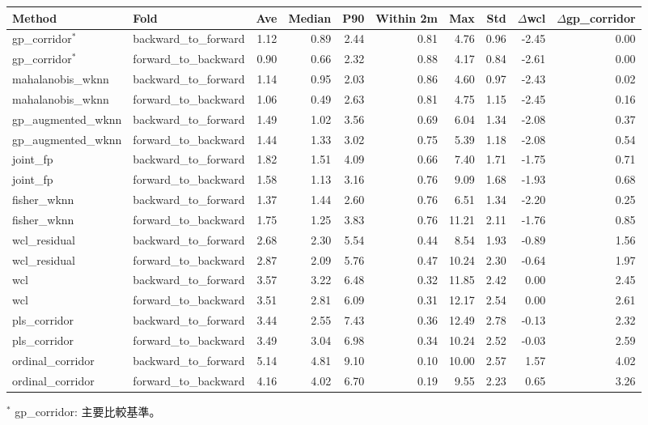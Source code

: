 \begin{tabular}{llrrrrrrrr}
\toprule
Method & Fold & Ave & Median & P90 & Within 2m & Max & Std & $\Delta$wcl & $\Delta$gp\_corridor \\
\midrule
gp\_corridor$^{\ast}$ & backward\_to\_forward & 1.12 & 0.89 & 2.44 & 0.81 & 4.76 & 0.96 & -2.45 & 0.00 \\
gp\_corridor$^{\ast}$ & forward\_to\_backward & 0.90 & 0.66 & 2.32 & 0.88 & 4.17 & 0.84 & -2.61 & 0.00 \\
mahalanobis\_wknn & backward\_to\_forward & 1.14 & 0.95 & 2.03 & 0.86 & 4.60 & 0.97 & -2.43 & 0.02 \\
mahalanobis\_wknn & forward\_to\_backward & 1.06 & 0.49 & 2.63 & 0.81 & 4.75 & 1.15 & -2.45 & 0.16 \\
gp\_augmented\_wknn & backward\_to\_forward & 1.49 & 1.02 & 3.56 & 0.69 & 6.04 & 1.34 & -2.08 & 0.37 \\
gp\_augmented\_wknn & forward\_to\_backward & 1.44 & 1.33 & 3.02 & 0.75 & 5.39 & 1.18 & -2.08 & 0.54 \\
joint\_fp & backward\_to\_forward & 1.82 & 1.51 & 4.09 & 0.66 & 7.40 & 1.71 & -1.75 & 0.71 \\
joint\_fp & forward\_to\_backward & 1.58 & 1.13 & 3.16 & 0.76 & 9.09 & 1.68 & -1.93 & 0.68 \\
fisher\_wknn & backward\_to\_forward & 1.37 & 1.44 & 2.60 & 0.76 & 6.51 & 1.34 & -2.20 & 0.25 \\
fisher\_wknn & forward\_to\_backward & 1.75 & 1.25 & 3.83 & 0.76 & 11.21 & 2.11 & -1.76 & 0.85 \\
wcl\_residual & backward\_to\_forward & 2.68 & 2.30 & 5.54 & 0.44 & 8.54 & 1.93 & -0.89 & 1.56 \\
wcl\_residual & forward\_to\_backward & 2.87 & 2.09 & 5.76 & 0.47 & 10.24 & 2.30 & -0.64 & 1.97 \\
wcl & backward\_to\_forward & 3.57 & 3.22 & 6.48 & 0.32 & 11.85 & 2.42 & 0.00 & 2.45 \\
wcl & forward\_to\_backward & 3.51 & 2.81 & 6.09 & 0.31 & 12.17 & 2.54 & 0.00 & 2.61 \\
pls\_corridor & backward\_to\_forward & 3.44 & 2.55 & 7.43 & 0.36 & 12.49 & 2.78 & -0.13 & 2.32 \\
pls\_corridor & forward\_to\_backward & 3.49 & 3.04 & 6.98 & 0.34 & 10.24 & 2.52 & -0.03 & 2.59 \\
ordinal\_corridor & backward\_to\_forward & 5.14 & 4.81 & 9.10 & 0.10 & 10.00 & 2.57 & 1.57 & 4.02 \\
ordinal\_corridor & forward\_to\_backward & 4.16 & 4.02 & 6.70 & 0.19 & 9.55 & 2.23 & 0.65 & 3.26 \\
\bottomrule
\end{tabular}
\par\footnotesize $^{\ast}$ gp\_corridor: 主要比較基準。
